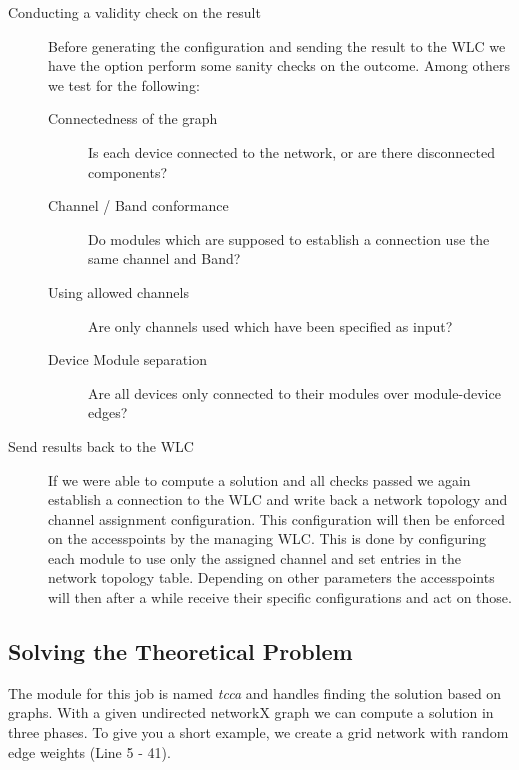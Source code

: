 \begin{description}
	\item[Conducting a validity check on the result]
	  Before generating the configuration and sending the result to the WLC we have the option perform some sanity checks on the outcome.
	  Among others we test for the following:
	  
	  \begin{description}
	    \item [Connectedness of the graph]
	      Is each device connected to the network, or are there disconnected components?
	    \item [Channel / Band conformance]
	      Do modules which are supposed to establish a connection use the same channel and Band?
	    \item [Using allowed channels]
	      Are only channels used which have been specified as input?
	    \item [Device Module separation]
	      Are all devices only connected to their modules over module-device edges?
	  \end{description}
	  
	\item [Send results back to the WLC]
	  If we were able to compute a solution and all checks passed we again establish a connection to the WLC and write back a network topology and channel assignment
	  configuration. This configuration will then be enforced on the accesspoints by the managing WLC.
	  This is done by configuring each module to use only the assigned channel and set entries in the network topology table. Depending on other parameters the
	  accesspoints will then after a while receive their specific configurations and act on those.
      \end{description}
      
    \subsection{Solving the Theoretical Problem}
      The module for this job is named \textit{tcca} and handles finding the solution based on graphs.
      With a given undirected networkX graph we can compute a solution in three phases.
      To give you a short example, we create a grid network with random edge weights (Line 5 - 41).
      
